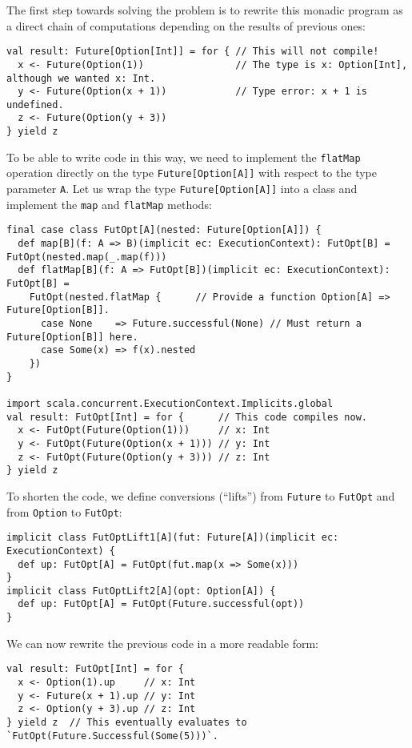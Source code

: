 The first step towards solving the problem is to rewrite this monadic
program as a direct chain of computations depending on the results
of previous ones:
\begin{lstlisting}
val result: Future[Option[Int]] = for { // This will not compile!
  x <- Future(Option(1))                // The type is x: Option[Int], although we wanted x: Int.
  y <- Future(Option(x + 1))            // Type error: x + 1 is undefined.
  z <- Future(Option(y + 3))
} yield z
\end{lstlisting}
To be able to write code in this way, we need to implement the \lstinline!flatMap!
operation directly on the type \lstinline!Future[Option[A]]! with
respect to the type parameter \lstinline!A!. Let us wrap the type
\lstinline!Future[Option[A]]! into a class and implement the \lstinline!map!
and \lstinline!flatMap! methods:
\begin{lstlisting}
final case class FutOpt[A](nested: Future[Option[A]]) {
  def map[B](f: A => B)(implicit ec: ExecutionContext): FutOpt[B] = FutOpt(nested.map(_.map(f)))
  def flatMap[B](f: A => FutOpt[B])(implicit ec: ExecutionContext): FutOpt[B] =
    FutOpt(nested.flatMap {      // Provide a function Option[A] => Future[Option[B]].
      case None    => Future.successful(None) // Must return a Future[Option[B]] here.
      case Some(x) => f(x).nested
    })
}

import scala.concurrent.ExecutionContext.Implicits.global
val result: FutOpt[Int] = for {      // This code compiles now.
  x <- FutOpt(Future(Option(1)))     // x: Int
  y <- FutOpt(Future(Option(x + 1))) // y: Int
  z <- FutOpt(Future(Option(y + 3))) // z: Int
} yield z
\end{lstlisting}
To shorten the code, we define conversions (\textsf{``}lifts\textsf{''}) from \lstinline!Future!
to \lstinline!FutOpt! and from \lstinline!Option! to \lstinline!FutOpt!:
\begin{lstlisting}
implicit class FutOptLift1[A](fut: Future[A])(implicit ec: ExecutionContext) {
  def up: FutOpt[A] = FutOpt(fut.map(x => Some(x)))
}
implicit class FutOptLift2[A](opt: Option[A]) {
  def up: FutOpt[A] = FutOpt(Future.successful(opt))
}
\end{lstlisting}
We can now rewrite the previous code in a more readable form:
\begin{lstlisting}
val result: FutOpt[Int] = for {
  x <- Option(1).up     // x: Int
  y <- Future(x + 1).up // y: Int
  z <- Option(y + 3).up // z: Int
} yield z  // This eventually evaluates to `FutOpt(Future.Successful(Some(5)))`.
\end{lstlisting}


